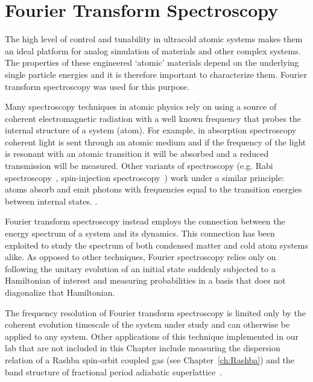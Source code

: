 

\renewcommand{\thechapter}{5}

\chapter{Fourier Transform Spectroscopy}
\label{ch:Fourier_spectroscopy}


The high level of control and tunability in ultracold atomic systems makes them an ideal platform for analog simulation of materials and other complex systems. The properties of these engineered `atomic' materials depend on the underlying single particle energies and it is therefore important to characterize them. Fourier transform spectroscopy was used for this purpose. 

Many spectroscopy techniques in atomic physics rely on using 
a source of coherent electromagnetic radiation with a well known frequency that probes the internal structure of a system (atom). For example, in absorption spectroscopy~\cite{demtroder_doppler-limited_2008} coherent light is sent through an atomic medium and if the frequency of the light is resonant with an atomic transition it will be absorbed and a reduced transmission will be measured. Other variants of spectroscopy (e.g. Rabi spectroscopy~\cite{rabi_space_1937}, spin-injection spectroscopy~\cite{cheuk_spin-injection_2012}) work under a similar principle: atoms absorb and emit photons with frequencies equal to the transition energies between internal states. .

Fourier transform spectroscopy instead employs the connection between the energy spectrum of a system and its dynamics. This connection has been exploited to study the spectrum of both condensed matter \cite{jonas_two-dimensional_2003} and cold atom systems \cite{yoshimura_diabatic-ramping_2014,wang_atom-interferometric_2015} alike.
As opposed to other techniques, Fourier spectroscopy relies only on following the unitary evolution of an initial state suddenly subjected to a Hamiltonian of interest and measuring probabilities in a basis that does not diagonalize that Hamiltonian. 

The frequency resolution of Fourier transform spectroscopy is limited only by the coherent evolution timescale of the system under study and can otherwise be applied to any system. Other applications of this technique implemented in our lab that are not included in this Chapter include measuring the dispersion relation of a Rashba spin-orbit coupled gas (see Chapter~\ref{ch:Rashba}) and the band structure of fractional period adiabatic superlattice~\cite{anderson_realization_2019}.

